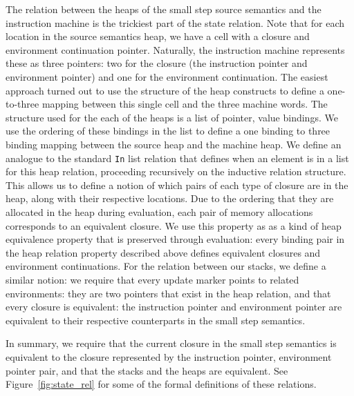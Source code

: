 The relation between the heaps of the small step source semantics and the
instruction machine is the trickiest part of the state relation. Note that for
each location in the source semantics heap, we have a cell with a closure and
environment continuation pointer. Naturally, the instruction machine represents
these as three pointers: two for the closure (the instruction pointer and
environment pointer) and one for the environment continuation. The easiest
approach turned out to use the structure of the heap constructs to define a
one-to-three mapping between this single cell and the three machine words. The
structure used for the each of the heaps is a list of pointer, value bindings.
We use the ordering of these bindings in the list to define a one binding to
three binding mapping between the source heap and the machine heap. We define an
analogue to the standard \texttt{In} list relation that defines when an element
is in a list for this heap relation, proceeding recursively on the inductive
relation structure. This allows us to define a notion of which pairs of each
type of closure are in the heap, along with their respective locations. Due to
the ordering that they are allocated in the heap during evaluation, each pair of
memory allocations corresponds to an equivalent closure. We use this property as
as a kind of heap equivalence property that is preserved through evaluation:
every binding pair in the heap relation property described above defines
equivalent closures and environment continuations. For the relation between our
stacks, we define a similar notion: we require that every update marker points
to related environments: they are two pointers that exist in the heap relation,
and that every closure is equivalent: the instruction pointer and environment
pointer are equivalent to their respective counterparts in the small step
semantics. 

In summary, we require that the current closure in the small step semantics is
equivalent to the closure represented by the instruction pointer, environment
pointer pair, and that the stacks and the heaps are equivalent. See
Figure~\ref{fig:state_rel} for some of the formal definitions of these
relations. 

